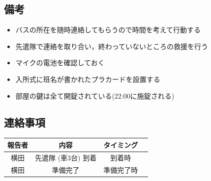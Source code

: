 \subsection{備考}
\begin{itemize}
\item バスの所在を随時連絡してもらうので時間を考えて行動する
\item 先遣隊で連絡を取り合い，終わっていないところの救援を行う
\item マイクの電池を確認しておく
\item 入所式に班名が書かれたプラカードを設置する
\item 部屋の鍵は全て開錠されている(22:00に施錠される)
\end{itemize}

\subsection{連絡事項}
\begin{table}[h]
\begin{center}
\begin{tabular}{|c|c|c|c|}
\hline
報告者 & 内容 & タイミング \\ \hline \hline
横田 & 先遣隊 (車3台) 到着 & 到着時\\ \hline
横田 & 準備完了 & 準備完了時 \\ \hline
\end{tabular}
\end{center}
\end{table}

%
